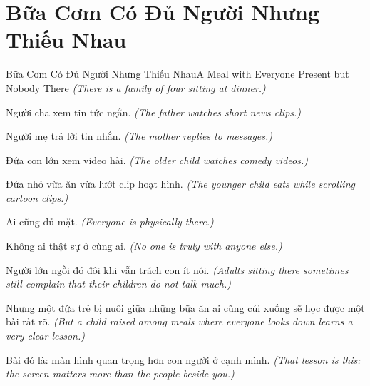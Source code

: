 \section{Bữa Cơm Có Đủ Người Nhưng Thiếu Nhau}
\begin{truyen}{Bữa Cơm Có Đủ Người Nhưng Thiếu Nhau}{A Meal with Everyone Present but Nobody There}
\textit{(There is a family of four sitting at dinner.)}

Người cha xem tin tức ngắn.
\textit{(The father watches short news clips.)}

Người mẹ trả lời tin nhắn.
\textit{(The mother replies to messages.)}

Đứa con lớn xem video hài.
\textit{(The older child watches comedy videos.)}

Đứa nhỏ vừa ăn vừa lướt clip hoạt hình.
\textit{(The younger child eats while scrolling cartoon clips.)}

Ai cũng đủ mặt.
\textit{(Everyone is physically there.)}

Không ai thật sự ở cùng ai.
\textit{(No one is truly with anyone else.)}


Người lớn ngồi đó đôi khi vẫn trách con ít nói.
\textit{(Adults sitting there sometimes still complain that their children do not talk much.)}

Nhưng một đứa trẻ bị nuôi giữa những bữa ăn ai cũng cúi xuống sẽ học được một bài rất rõ.
\textit{(But a child raised among meals where everyone looks down learns a very clear lesson.)}

Bài đó là: màn hình quan trọng hơn con người ở cạnh mình.
\textit{(That lesson is this: the screen matters more than the people beside you.)}
\end{truyen}

